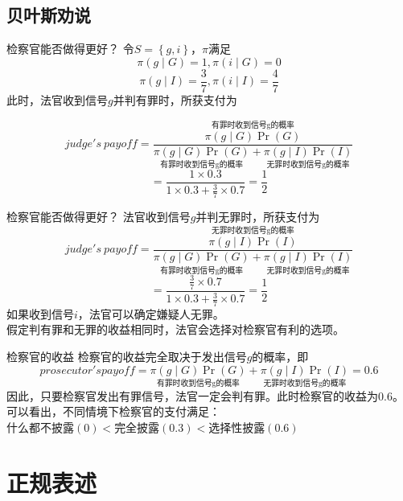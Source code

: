 \documentclass{beamer}
\begin{document}
\subsection{贝叶斯劝说}

\begin{frame}{检察官能否做得更好？}
	令$S=\left\lbrace g,i\right\rbrace $，$\pi$满足
	$$\pi\left( g\mid G \right)=1, \pi\left( i\mid G \right)=0$$
	$$\pi\left( g\mid I \right)=\frac{3}{7}, \pi\left( i\mid I \right)=\frac{4}{7}$$\pause
	此时，法官收到信号$g$并判有罪时，所获支付为\pause

	$$judge's \ payoff=\frac{\overset{\text{有罪时收到信号g的概率}}{\pi\left( g \mid G\right) \Pr\left( G\right)} }{\underset{\text{有罪时收到信号g的概率}}{\pi\left( g \mid G\right) \Pr\left( G\right)}+\underset{\text{无罪时收到信号g的概率}}{\pi\left( g \mid I\right) \Pr\left( I\right)}}$$\pause
	$$=\frac{1\times0.3}{1\times 0.3+\frac{3}{7}\times 0.7}=\frac{1}{2}$$
\end{frame}

\begin{frame}{检察官能否做得更好？}
	法官收到信号$g$并判无罪时，所获支付为
	$$judge's \ payoff=\frac{\overset{\text{无罪时收到信号g的概率}}{\pi\left( g \mid I\right) \Pr\left( I\right)} }{\underset{\text{有罪时收到信号g的概率}}{\pi\left( g \mid G\right) \Pr\left( G\right)}+\underset{\text{无罪时收到信号g的概率}}{\pi\left( g \mid I\right) \Pr\left( I\right)}}$$\pause
	$$=\frac{\frac{3}{7}\times 0.7}{1\times 0.3+\frac{3}{7}\times 0.7}=\frac{1}{2}$$\pause
	如果收到信号$i$，法官可以确定嫌疑人无罪。\pause\\
	\alert{假定判有罪和无罪的收益相同时，法官会选择对检察官有利的选项}。
\end{frame}

\begin{frame}{检察官的收益}
	检察官的收益完全取决于发出信号$g$的概率，即
	$$prosecutor's payoff=\underset{\text{有罪时收到信号g的概率}}{\pi\left( g \mid G\right) \Pr\left( G\right)}+\underset{\text{无罪时收到信号g的概率}}{\pi\left( g \mid I\right) \Pr\left( I\right)}=0.6$$
	因此，只要检察官发出有罪信号，法官一定会判有罪。此时检察官的收益为0.6。\pause\\
	可以看出，不同情境下检察官的支付满足：\\
	什么都不披露$\left(0\right)<$完全披露$\left( 0.3\right) <$选择性披露$ \left( 0.6\right) $ 
\end{frame}

\section{正规表述}
\end{document}
